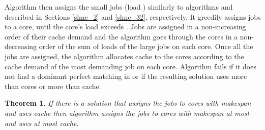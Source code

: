 \documentclass[11pt]{article}
\newtheorem{theorem}{Theorem}[section]
\begin{document}
Algorithm  then assigns the small jobs (load ) similarly to algorithms  and  described in  Sections \ref{slmc_2} and \ref{slmc_32}, respectively.
It greedily assigns jobs to a core, until the core's load exceeds . Jobs are assigned in a non-increasing order of their cache demand and the algorithm goes through the cores in a non-decreasing order of the sum of loads of the large jobs on each core. Once all the jobs are assigned, the algorithm allocates cache to the cores according to the cache demand of the most demanding job on each core.
Algorithm  fails if it does not find a dominant perfect matching in  or if the resulting solution uses more than  cores or more than  cache.

\begin{theorem}\label{proof_43}
If there is a solution that assigns the jobs to  cores with makespan  and uses  cache then algorithm  assigns the jobs to  cores with makespan at most  and uses at most  cache.
\end{theorem}
\end{document}

